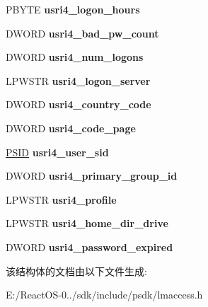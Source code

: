 \begin{DoxyCompactItemize}
\item 
\mbox{\label{struct___u_s_e_r___i_n_f_o__4_ae640b9e92f6d50861432ed0f758f590f}} 
P\+B\+Y\+TE {\bfseries usri4\+\_\+logon\+\_\+hours}
\item 
\mbox{\label{struct___u_s_e_r___i_n_f_o__4_a16ee2465567a6fe71d42dc49e3b68527}} 
D\+W\+O\+RD {\bfseries usri4\+\_\+bad\+\_\+pw\+\_\+count}
\item 
\mbox{\label{struct___u_s_e_r___i_n_f_o__4_a0b18c9d65822e56f81cb86f5b852bb0b}} 
D\+W\+O\+RD {\bfseries usri4\+\_\+num\+\_\+logons}
\item 
\mbox{\label{struct___u_s_e_r___i_n_f_o__4_a68d7eb7bda784bc3b59ed9e60d2506c6}} 
L\+P\+W\+S\+TR {\bfseries usri4\+\_\+logon\+\_\+server}
\item 
\mbox{\label{struct___u_s_e_r___i_n_f_o__4_aab9e57c3b2a406f295cdbacd89567b3b}} 
D\+W\+O\+RD {\bfseries usri4\+\_\+country\+\_\+code}
\item 
\mbox{\label{struct___u_s_e_r___i_n_f_o__4_ab83d68fec4b6e610d2b3bd6ffffbec17}} 
D\+W\+O\+RD {\bfseries usri4\+\_\+code\+\_\+page}
\item 
\mbox{\label{struct___u_s_e_r___i_n_f_o__4_a0e729118b8885140bd06b867c4ad8ea0}} 
\hyperlink{struct___s_i_d}{P\+S\+ID} {\bfseries usri4\+\_\+user\+\_\+sid}
\item 
\mbox{\label{struct___u_s_e_r___i_n_f_o__4_a3b2aab234330493f38baba01ae4e18ba}} 
D\+W\+O\+RD {\bfseries usri4\+\_\+primary\+\_\+group\+\_\+id}
\item 
\mbox{\label{struct___u_s_e_r___i_n_f_o__4_a601c7ec2e1d6313d62965852540f5b03}} 
L\+P\+W\+S\+TR {\bfseries usri4\+\_\+profile}
\item 
\mbox{\label{struct___u_s_e_r___i_n_f_o__4_a26459d159d1625d50b2a4cf8023f6252}} 
L\+P\+W\+S\+TR {\bfseries usri4\+\_\+home\+\_\+dir\+\_\+drive}
\item 
\mbox{\label{struct___u_s_e_r___i_n_f_o__4_a0536c17a6f169e667eaf7c6a00557f95}} 
D\+W\+O\+RD {\bfseries usri4\+\_\+password\+\_\+expired}
\end{DoxyCompactItemize}


该结构体的文档由以下文件生成\+:\begin{DoxyCompactItemize}
\item 
E\+:/\+React\+O\+S-\/0../sdk/include/psdk/lmaccess.\+h\end{DoxyCompactItemize}
